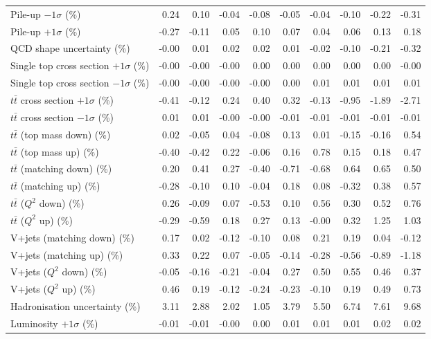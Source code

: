 \begin{table}[htbp]
{\begin{tabular}{lrrrrrrrrr}
Pile-up $-1\sigma$ (\%) & 0.24 & 0.10 & -0.04 & -0.08 & -0.05 & -0.04 & -0.10 & -0.22 & -0.31 \\ 
Pile-up $+1\sigma$ (\%) & -0.27 & -0.11 & 0.05 & 0.10 & 0.07 & 0.04 & 0.06 & 0.13 & 0.18 \\ 
QCD shape uncertainty (\%) & -0.00 & 0.01 & 0.02 & 0.02 & 0.01 & -0.02 & -0.10 & -0.21 & -0.32 \\ 
Single top cross section $+1\sigma$ (\%) & -0.00 & -0.00 & -0.00 & 0.00 & 0.00 & 0.00 & 0.00 & 0.00 & -0.00 \\ 
Single top cross section $-1\sigma$ (\%) & -0.00 & -0.00 & -0.00 & -0.00 & 0.00 & 0.01 & 0.01 & 0.01 & 0.01 \\ 
$t\bar{t}$ cross section $+1\sigma$ (\%) & -0.41 & -0.12 & 0.24 & 0.40 & 0.32 & -0.13 & -0.95 & -1.89 & -2.71 \\ 
$t\bar{t}$ cross section $-1\sigma$ (\%) & 0.01 & 0.01 & -0.00 & -0.00 & -0.01 & -0.01 & -0.01 & -0.01 & -0.01 \\ 
$t\bar{t}$ (top mass down) (\%) & 0.02 & -0.05 & 0.04 & -0.08 & 0.13 & 0.01 & -0.15 & -0.16 & 0.54 \\ 
$t\bar{t}$ (top mass up) (\%) & -0.40 & -0.42 & 0.22 & -0.06 & 0.16 & 0.78 & 0.15 & 0.18 & 0.47 \\ 
$t\bar{t}$ (matching down) (\%) & 0.20 & 0.41 & 0.27 & -0.40 & -0.71 & -0.68 & 0.64 & 0.65 & 0.50 \\ 
$t\bar{t}$ (matching up) (\%) & -0.28 & -0.10 & 0.10 & -0.04 & 0.18 & 0.08 & -0.32 & 0.38 & 0.57 \\ 
$t\bar{t}$ ($Q^{2}$ down) (\%) & 0.26 & -0.09 & 0.07 & -0.53 & 0.10 & 0.56 & 0.30 & 0.52 & 0.76 \\ 
$t\bar{t}$ ($Q^{2}$ up) (\%) & -0.29 & -0.59 & 0.18 & 0.27 & 0.13 & -0.00 & 0.32 & 1.25 & 1.03 \\ 
V+jets (matching down) (\%) & 0.17 & 0.02 & -0.12 & -0.10 & 0.08 & 0.21 & 0.19 & 0.04 & -0.12 \\ 
V+jets (matching up) (\%) & 0.33 & 0.22 & 0.07 & -0.05 & -0.14 & -0.28 & -0.56 & -0.89 & -1.18 \\ 
V+jets ($Q^{2}$ down) (\%) & -0.05 & -0.16 & -0.21 & -0.04 & 0.27 & 0.50 & 0.55 & 0.46 & 0.37 \\ 
V+jets ($Q^{2}$ up) (\%) & 0.46 & 0.19 & -0.12 & -0.24 & -0.23 & -0.10 & 0.19 & 0.49 & 0.73 \\ 
Hadronisation uncertainty (\%) & 3.11 & 2.88 & 2.02 & 1.05 & 3.79 & 5.50 & 6.74 & 7.61 & 9.68 \\ 
Luminosity $+1\sigma$ (\%) & -0.01 & -0.01 & -0.00 & 0.00 & 0.01 & 0.01 & 0.01 & 0.02 & 0.02 \\ 

\end{tabular}}
\end{table}
